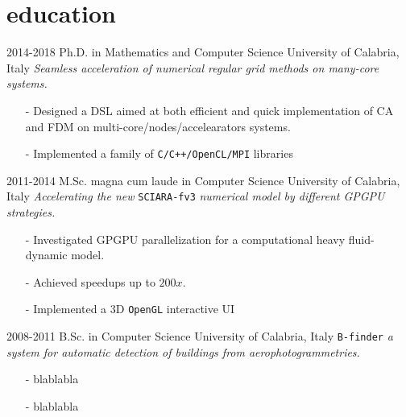 \documentclass[]{twentysecondscv}
\begin{document}
\section{education}

\begin{twenty}
\fivetwentyitem
    {2014-2018}
    {Ph.D. {\normalfont in Mathematics and Computer Science}}
    {University of Calabria, Italy}
    {\emph{Seamless acceleration of numerical regular grid methods on many-core systems.}}
    {
    	\vspace{-15pt}
    	\begin{itemize}[leftmargin=*]
    		\footnotesize
    		\item[-] Designed a DSL aimed at both efficient and quick implementation of CA and FDM on multi-core/nodes/accelearators systems.
    		\item[-] Implemented a family of \texttt{C/C++/OpenCL/MPI} libraries \href{www.blablabla.it}{\faGithub}
    	\end{itemize} 
    }
  \fivetwentyitem
    {2011-2014}
    {M.Sc. magna cum laude in Computer Science}
    {University of Calabria, Italy}
    {\emph{Accelerating the new} \texttt{SCIARA-fv3} \emph{numerical model by different GPGPU strategies.}}
    {
    	\vspace{-15pt}
    	\begin{itemize}[leftmargin=*]
    		\footnotesize
    		\item[-] Investigated GPGPU parallelization for a computational heavy fluid-dynamic model.
    		\item[-] Achieved speedups up to $200x$.
			\item[-] Implemented a 3D \texttt{OpenGL} interactive UI
    	\end{itemize} 
    }
  \fivetwentyitem
    {2008-2011}
    {B.Sc. in Computer Science}
    {University of Calabria, Italy}
    {\texttt{B-finder}\emph{ a system for automatic detection of buildings from aerophotogrammetries.}}
    {
    	\vspace{-15pt}
    	\begin{itemize}[leftmargin=*]
    		\footnotesize
    		\item[-] blablabla
    		\item[-] blablabla
    	\end{itemize} 
    }
\end{twenty}
\end{document}

